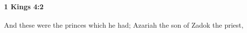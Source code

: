 
		\paragraph{1 Kings 4:2} %
			\label{1KINGS-4-2}

			And these were the princes which he had; Azariah the son of Zadok the priest,


